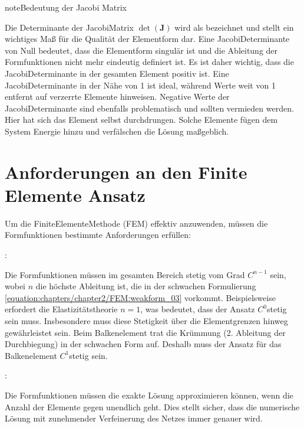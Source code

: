 \documentclass[letterpaper,10pt,german]{jupyterBook}
\begin{document}
\begin{sphinxadmonition}{note}{Bedeutung der Jacobi Matrix}

\sphinxAtStartPar
Die Determinante der Jacobi\sphinxhyphen{}Matrix \(\det(\bm{J})\) wird als  bezeichnet und stellt ein wichtiges Maß für die Qualität der Elementform dar. Eine Jacobi\sphinxhyphen{}Determinante von Null bedeutet, dass die Elementform singulär ist und die Ableitung der Formfunktionen nicht mehr eindeutig definiert ist. Es ist daher wichtig, dass die Jacobi\sphinxhyphen{}Determinante in der gesamten Element positiv ist. Eine Jacobi\sphinxhyphen{}Determinante in der Nähe von 1 ist ideal, während Werte weit von 1 entfernt auf verzerrte Elemente hinweisen. Negative Werte der Jacobi\sphinxhyphen{}Determinante sind ebenfalls problematisch und sollten vermieden werden. Hier hat sich das Element selbst durchdrungen. Solche Elemente fügen dem System Energie hinzu und verfälschen die Lösung maßgeblich.
\end{sphinxadmonition}


\section{Anforderungen an den Finite Elemente Ansatz}
\label{\detokenize{chapters/chapter3/isoparametrischeFEM:anforderungen-an-den-finite-elemente-ansatz}}
\sphinxAtStartPar
Um die Finite\sphinxhyphen{}Elemente\sphinxhyphen{}Methode (FEM) effektiv anzuwenden, müssen die Formfunktionen bestimmte Anforderungen erfüllen:

\sphinxAtStartPar
{}:

\sphinxAtStartPar
Die Formfunktionen müssen im gesamten Bereich stetig vom Grad \(C^{n-1}\) sein, wobei \(n\) die höchste Ableitung ist, die in der schwachen Formulierung \eqref{equation:chapters/chapter2/FEM:weakform_03} vorkommt. Beispielsweise erfordert die Elastizitätstheorie \(n=1\), was bedeutet, dass der Ansatz \(C^0\)\sphinxhyphen{}stetig sein muss. Insbesondere muss diese Stetigkeit über die Elementgrenzen hinweg gewährleistet sein.
Beim Balkenelement trat die Krümmung (2. Ableitung der Durchbiegung) in der schwachen Form auf. Deshalb muss der Ansatz für das Balkenelement \(C^1\)\sphinxhyphen{}stetig sein.

\sphinxAtStartPar
{}:

\sphinxAtStartPar
Die Formfunktionen müssen die exakte Lösung approximieren können, wenn die Anzahl der Elemente gegen unendlich geht. Dies stellt sicher, dass die numerische Lösung mit zunehmender Verfeinerung des Netzes immer genauer wird.
\end{document}
